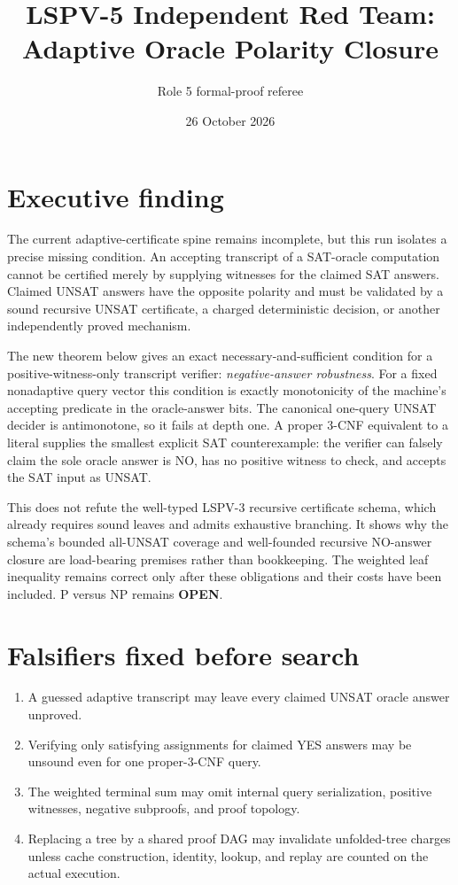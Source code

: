 \documentclass[11pt]{article}
\title{LSPV-5 Independent Red Team: Adaptive Oracle Polarity Closure}
\author{Role 5 formal-proof referee}
\date{26 October 2026}
\newcommand{\status}[1]{\textbf{#1}}
\begin{document}
\maketitle

\section*{Executive finding}
The current adaptive-certificate spine remains incomplete, but this run
isolates a precise missing condition.  An accepting transcript of a SAT-oracle
computation cannot be certified merely by supplying witnesses for the claimed
SAT answers.  Claimed UNSAT answers have the opposite polarity and must be
validated by a sound recursive UNSAT certificate, a charged deterministic
decision, or another independently proved mechanism.

The new theorem below gives an exact necessary-and-sufficient condition for a
positive-witness-only transcript verifier: \emph{negative-answer robustness}.
For a fixed nonadaptive query vector this condition is exactly monotonicity of
the machine's accepting predicate in the oracle-answer bits.  The canonical
one-query UNSAT decider is antimonotone, so it fails at depth one.  A proper
3-CNF equivalent to a literal supplies the smallest explicit SAT
counterexample: the verifier can falsely claim the sole oracle answer is NO,
has no positive witness to check, and accepts the SAT input as UNSAT.

This does not refute the well-typed LSPV-3 recursive certificate schema, which
already requires sound leaves and admits exhaustive branching.  It shows why
the schema's bounded all-UNSAT coverage and well-founded recursive NO-answer
closure are load-bearing premises rather than bookkeeping.  The weighted leaf
inequality remains correct only after these obligations and their costs have
been included.  P versus NP remains \status{OPEN}.

\section*{Falsifiers fixed before search}
\begin{enumerate}
  \item A guessed adaptive transcript may leave every claimed UNSAT oracle
        answer unproved.
  \item Verifying only satisfying assignments for claimed YES answers may be
        unsound even for one proper-3-CNF query.
  \item The weighted terminal sum may omit internal query serialization,
        positive witnesses, negative subproofs, and proof topology.
  \item Replacing a tree by a shared proof DAG may invalidate unfolded-tree
        charges unless cache construction, identity, lookup, and replay are
        counted on the actual execution.
\end{enumerate}
\end{document}
